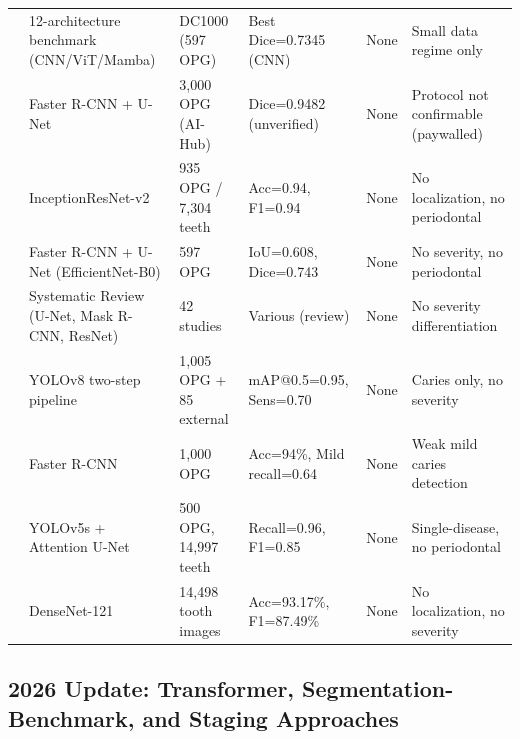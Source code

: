 \documentclass[conference]{IEEEtran}
\begin{document}
\begin{table}[t]
\begin{tabular}{p{0.6cm} p{4.8cm} p{3.0cm} p{3.5cm} p{1.0cm} p{3.2cm}}
\cite{ghimire2025cnns}      & 12-architecture benchmark (CNN/ViT/Mamba) & DC1000 (597 OPG) & Best Dice=0.7345 (CNN) & None & Small data regime only \\
\cite{kim2026automated}     & Faster R-CNN + U-Net & 3,000 OPG (AI-Hub) & Dice=0.9482 (unverified) & None & Protocol not confirmable (paywalled) \\
\cite{zancan2025ai}         & InceptionResNet-v2 & 935 OPG / 7,304 teeth & Acc=0.94, F1=0.94 & None & No localization, no periodontal \\
\cite{lim2024dual}          & Faster R-CNN + U-Net (EfficientNet-B0) & 597 OPG & IoU=0.608, Dice=0.743 & None & No severity, no periodontal \\
\cite{zanini2024systematic} & Systematic Review (U-Net, Mask R-CNN, ResNet) & 42 studies & Various (review) & None & No severity differentiation \\
\cite{bizjak2024advancing}  & YOLOv8 two-step pipeline & 1,005 OPG + 85 external & mAP@0.5=0.95, Sens=0.70 & None & Caries only, no severity \\
\cite{asadi2024detection}   & Faster R-CNN & 1,000 OPG & Acc=94\%, Mild recall=0.64 & None & Weak mild caries detection \\
\cite{pornprasertsuk2025clinical} & YOLOv5s + Attention U-Net & 500 OPG, 14,997 teeth & Recall=0.96, F1=0.85 & None & Single-disease, no periodontal \\
\cite{ozdemir2026enhanced}  & DenseNet-121 & 14,498 tooth images & Acc=93.17\%, F1=87.49\% & None & No localization, no severity \\
\bottomrule
\end{tabular}
\end{table}

\subsection{2026 Update: Transformer, Segmentation-Benchmark, and Staging Approaches}
\end{document}
